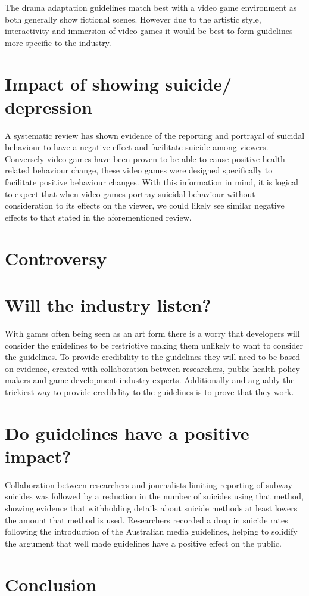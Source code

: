 \documentclass{scrartcl}
\begin{document}
		The drama adaptation guidelines match best with a video game environment as both generally show fictional scenes. However due to the artistic style, interactivity and immersion of video games it would be best to form guidelines more specific to the industry. 	

	\section{Impact of showing suicide/ depression}
		A systematic review\cite{pirkis2001suicide} has shown evidence of the reporting and portrayal of suicidal behaviour to have a negative effect and facilitate suicide among viewers. Conversely video games have been proven to be able to cause positive health-related behaviour change\cite{baranowski2008playing}, these video games were designed specifically to facilitate positive behaviour changes. With this information in mind, it is logical to expect that when video games portray suicidal behaviour without consideration to its effects on the viewer, we could likely see similar negative effects to that stated in the aforementioned review\cite{pirkis2001suicide}.
		
	\section{Controversy}
	\section{Will the industry listen?}
		With games often being seen as an art form\cite{pearce2006games} there is a worry that developers will consider the guidelines to be restrictive making them unlikely to want to consider the guidelines. To provide credibility to the guidelines they will need to be based on evidence, created with collaboration between researchers, public health policy makers and game development industry experts\cite{hawton2002influences}. Additionally and arguably the trickiest way to  provide credibility to the guidelines is to prove that they work.
		
	\section{Do guidelines have a positive impact?}
		Collaboration between researchers and journalists limiting reporting of subway suicides was followed by a reduction in the number of suicides using that method\cite{etzersdorfer1998preventing}, showing evidence that withholding details about suicide methods at least lowers the amount that method is used. 
		Researchers recorded a drop in suicide rates following the introduction of the Australian media guidelines\cite{niederkrotenthaler2007assessing}, helping to solidify the argument that well made guidelines have a positive effect on the public. 
	\section{Conclusion}
	
	
	
\end{document}
